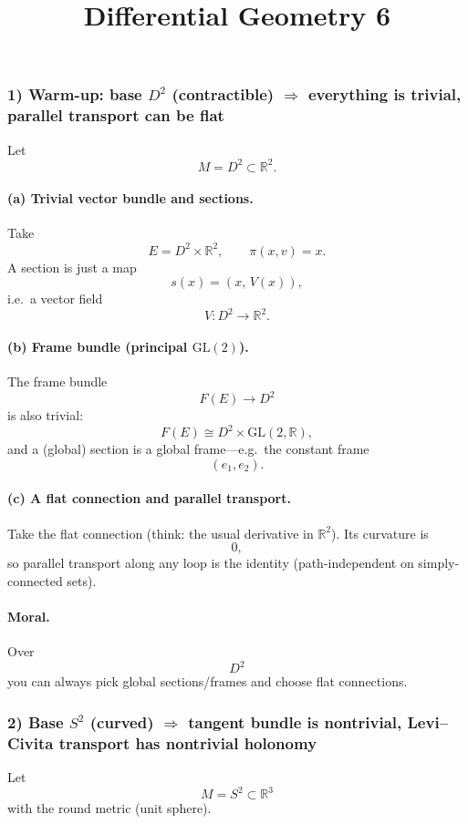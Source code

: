 \documentclass[12pt,a4paper]{article}
\title{Differential Geometry 6}
\author{}
\date{}
\theoremstyle{plain}
\theoremstyle{definition}      %
\begin{document}
	\maketitle

\subsubsection*{1) Warm-up: base $D^2$ (contractible) $\Rightarrow$ everything is trivial, parallel transport can be flat}

Let
\[
M = D^2 \subset \mathbb{R}^2.
\]

\paragraph{(a) Trivial vector bundle and sections.}
Take
\[
E = D^2 \times \mathbb{R}^2,
\qquad
\pi(x,v)=x.
\]
A section is just a map
\[
s(x)=(x,\,V(x)),
\]
i.e.\ a vector field
\[
V:D^2\to \mathbb{R}^2.
\]

\paragraph{(b) Frame bundle (principal $\mathrm{GL}(2)$).}
The frame bundle
\[
F(E)\to D^2
\]
is also trivial:
\[
F(E)\cong D^2\times \mathrm{GL}(2,\mathbb{R}),
\]
and a (global) section is a global frame---e.g.\ the constant frame
\[
(e_1,e_2).
\]

\paragraph{(c) A flat connection and parallel transport.}
Take the flat connection (think: the usual derivative in $\mathbb{R}^2$).
Its curvature is
\[
0,
\]
so parallel transport along any loop is the identity (path-independent on simply-connected sets).

\paragraph{Moral.}
Over
\[
D^2
\]
you can always pick global sections/frames and choose flat connections.


\subsubsection*{2) Base $S^2$ (curved) $\Rightarrow$ tangent bundle is nontrivial, Levi--Civita transport has nontrivial holonomy}

Let
\[
M=S^2\subset \mathbb{R}^3
\]
with the round metric (unit sphere).
\end{document}
